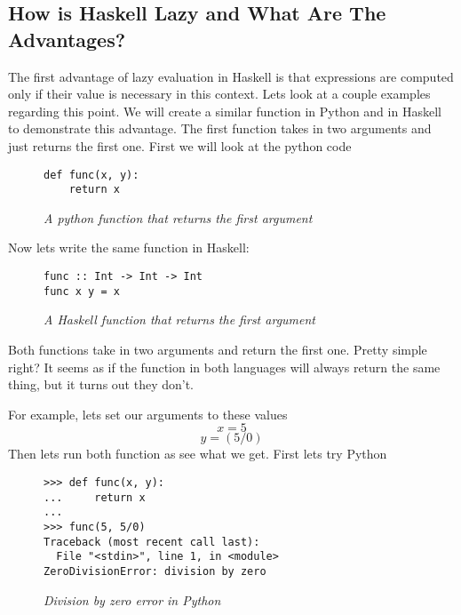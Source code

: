 \documentclass{article}
\begin{document}
\subsection{How is Haskell Lazy and What Are The Advantages?}

\medskip\noindent
The first advantage of lazy evaluation in Haskell is that expressions are computed only if their value is  necessary in this context. Lets look at a couple examples regarding this point. We will create a similar function in Python and in Haskell to demonstrate this advantage. The first function takes in two arguments and just returns the first one. First we will look at the python code
\begin{figure}[H]
    \begin{lstlisting}
def func(x, y):
    return x
    \end{lstlisting}
    \vspace{-1.5em}

    \caption{\textit{A python function that returns the first argument}}
\end{figure}

\medskip\noindent
Now lets write the same function in Haskell:

\begin{figure}[H]
    \begin{lstlisting}
func :: Int -> Int -> Int
func x y = x
    \end{lstlisting}
    \caption{\textit{A Haskell function that returns the first argument}}
\end{figure}

\medskip\noindent
Both functions take in two arguments and return the first one. Pretty simple right? It seems as if the function in both languages will always return the same thing, but it turns out they don't. 

\medskip\noindent
For example, lets set our arguments to these values $$x = 5$$ $$y = (5/0)$$ Then lets run both function as see what we get. First lets try Python

\begin{figure}[H]
    \begin{lstlisting}
>>> def func(x, y):
...     return x
... 
>>> func(5, 5/0)
Traceback (most recent call last):
  File "<stdin>", line 1, in <module>
ZeroDivisionError: division by zero
    \end{lstlisting}
    \caption{\textit{Division by zero error in Python}}
\end{figure}
\end{document}
